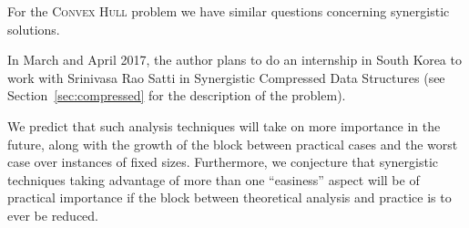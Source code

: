 
For the \textsc{Convex Hull} problem we have similar questions
concerning synergistic solutions.


In March and April 2017, the author plans to do an internship in South
Korea to work with Srinivasa Rao Satti in Synergistic Compressed Data
Structures (see Section~\ref{sec:compressed} for the description of
the problem).

We predict that such analysis techniques will take on more importance
in the future, along with the growth of the block between practical
cases and the worst case over instances of fixed sizes. Furthermore,
we conjecture that synergistic techniques taking advantage of more
than one ``easiness'' aspect will be of practical importance if the
block between theoretical analysis and practice is to ever be reduced.

